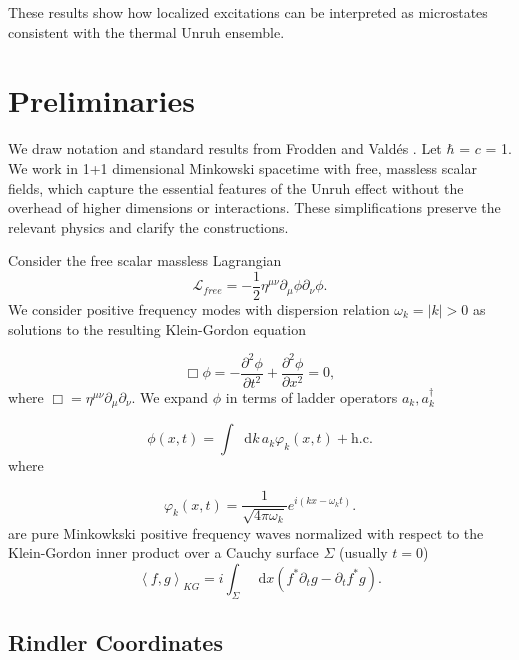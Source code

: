 \documentclass[12pt,a4paper]{article}
\newcommand*\diff{\mathop{}\!\mathrm{d}}
\begin{document}
These results show how localized excitations can be interpreted as microstates consistent with the thermal Unruh ensemble.

\section{Preliminaries} \label{sec:prelim}

We draw notation and standard results from Frodden and Vald{\'{e}}s \cite{frodden2018unruh}. Let $\hbar$ = $c$ = 1. We work in 1+1 dimensional Minkowski spacetime with free, massless scalar fields, which capture the essential features of the Unruh effect without the overhead of higher dimensions or interactions. These simplifications preserve the relevant physics and clarify the constructions.

Consider the free scalar massless Lagrangian
\begin{equation}
\mathscr{L}_{free} = -\frac{1}{2} \eta^{\mu\nu}\partial_\mu \phi \partial_\nu \phi.
\end{equation}
We consider positive frequency modes with dispersion relation $\omega_k = |k| > 0$ as solutions to the resulting Klein-Gordon equation 

\begin{equation}
  \Box \phi = -\frac{\partial^2 \phi}{\partial t^2} + \frac{\partial^2 \phi}{\partial x^2} = 0,
 \label{massless-wave-eq}
\end{equation}
where $\Box = \eta^{\mu\nu} \partial_\mu \partial_\nu$. We expand $\phi$ in terms of ladder operators $a_k, a_k^\dagger$

\begin{equation}
  \phi(x,t) = \int \diff k \, a_k \varphi_k(x,t) + \text{h.c.}
\end{equation}
where

\begin{equation}
  \varphi_k(x,t) = \frac{1}{\sqrt{4\pi\omega_k}} e^{i(kx - \omega_k t)}.
\label{amode}
\end{equation}
are pure Minkowkski positive frequency waves normalized with respect to the Klein-Gordon inner product over a Cauchy surface $\Sigma$ (usually $t = 0$)
\begin{equation}
  \left<f, g\right>_{KG} = i \int_\Sigma \diff x (f^* \partial_t g - \partial_t f^* g).
\end{equation}

\subsection{Rindler Coordinates} 
\end{document}
